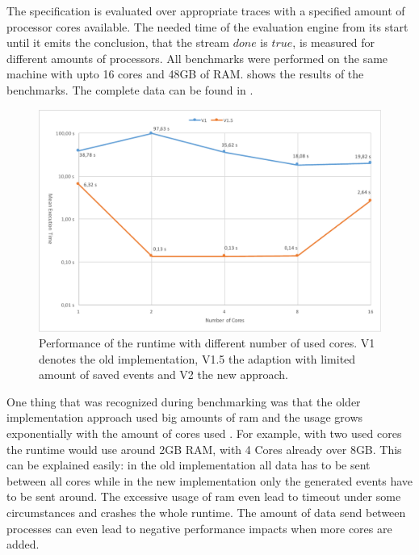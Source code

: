 The specification is evaluated over appropriate traces with a specified amount of processor cores available.
The needed time of the evaluation engine from its start until it emits the conclusion, that the stream \(\mathit{done}\) is \(\mathit{true}\), is measured for different amounts of processors.
All benchmarks were performed on the same machine  with upto 16 cores and 48GB of RAM.
 shows the results of the benchmarks.
The complete data can be found in .

\begin{figure}
  \includegraphics[width=\textwidth]{gfx/runtime_num_cores_benchmark}
  \caption[Performance of the runtime with different number of used cores]{Performance of the runtime with different number of used cores. V1 denotes the old implementation, V1.5 the adaption with limited amount of saved events and V2 the new approach.}
\label{fig:chap_eval:runtime_num_cores}
\end{figure}

One thing that was recognized during benchmarking was that the older implementation approach used big amounts of \gls{ram} and the usage grows exponentially with the amount of cores used .
For example, with two used cores the runtime would use around 2GB RAM, with 4 Cores already over 8GB.
This can be explained easily: in the old implementation all data has to be sent between all cores while in the new implementation only the generated events have to be sent around.
The excessive usage of \gls{ram} even lead to timeout under some circumstances and crashes the whole runtime.
The amount of data send between processes can even lead to negative performance impacts when more cores are added.

